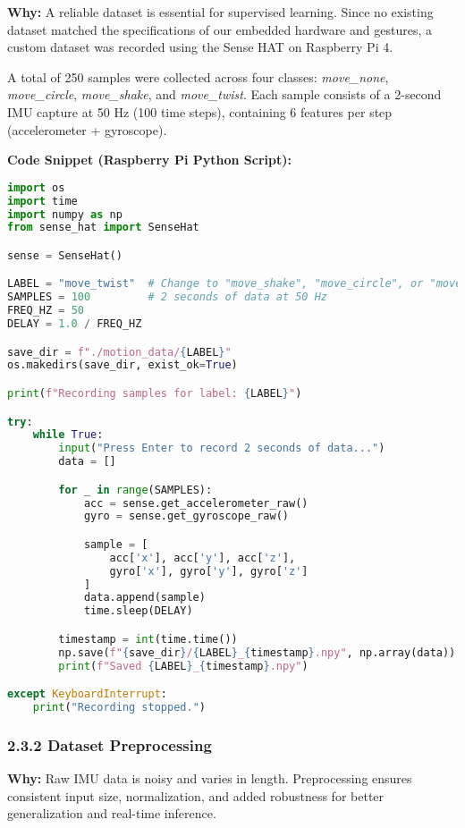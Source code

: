 \documentclass[a4paper,12pt]{article}
\begin{document}
\textbf{Why:} A reliable dataset is essential for supervised learning. Since no existing dataset matched the specifications of our embedded hardware and gestures, a custom dataset was recorded using the Sense HAT on Raspberry Pi 4.

A total of 250 samples were collected across four classes: \textit{move\_none}, \textit{move\_circle}, \textit{move\_shake}, and \textit{move\_twist}. Each sample consists of a 2-second IMU capture at 50 Hz (100 time steps), containing 6 features per step (accelerometer + gyroscope).

\textbf{Code Snippet (Raspberry Pi Python Script):}
\begin{lstlisting}[language=Python]
import os
import time
import numpy as np
from sense_hat import SenseHat

sense = SenseHat()

LABEL = "move_twist"  # Change to "move_shake", "move_circle", or "move_none"
SAMPLES = 100         # 2 seconds of data at 50 Hz
FREQ_HZ = 50
DELAY = 1.0 / FREQ_HZ

save_dir = f"./motion_data/{LABEL}"
os.makedirs(save_dir, exist_ok=True)

print(f"Recording samples for label: {LABEL}")

try:
    while True:
        input("Press Enter to record 2 seconds of data...")
        data = []

        for _ in range(SAMPLES):
            acc = sense.get_accelerometer_raw()
            gyro = sense.get_gyroscope_raw()

            sample = [
                acc['x'], acc['y'], acc['z'],
                gyro['x'], gyro['y'], gyro['z']
            ]
            data.append(sample)
            time.sleep(DELAY)

        timestamp = int(time.time())
        np.save(f"{save_dir}/{LABEL}_{timestamp}.npy", np.array(data))
        print(f"Saved {LABEL}_{timestamp}.npy")

except KeyboardInterrupt:
    print("Recording stopped.")
\end{lstlisting}

\subsubsection*{2.3.2 Dataset Preprocessing}

\textbf{Why:} Raw IMU data is noisy and varies in length. Preprocessing ensures consistent input size, normalization, and added robustness for better generalization and real-time inference.
\end{document}
